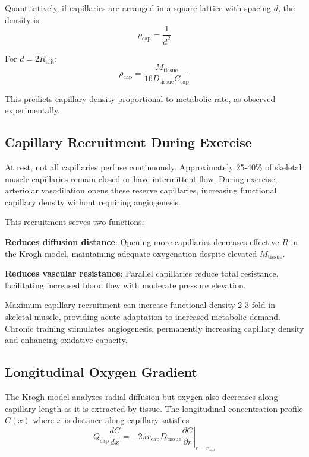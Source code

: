 Quantitatively, if capillaries are arranged in a square lattice with spacing $d$, the density is
\begin{equation}
\rho_{\mathrm{cap}} = \frac{1}{d^{2}}
\end{equation}

For $d = 2R_{\mathrm{crit}}$:
\begin{equation}
\rho_{\mathrm{cap}} = \frac{M_{\mathrm{tissue}}}{16D_{\mathrm{tissue}} C_{\mathrm{cap}}}
\end{equation}

This predicts capillary density proportional to metabolic rate, as observed experimentally.

\subsection{Capillary Recruitment During Exercise}

At rest, not all capillaries perfuse continuously. Approximately 25-40\% of skeletal muscle capillaries remain closed or have intermittent flow. During exercise, arteriolar vasodilation opens these reserve capillaries, increasing functional capillary density without requiring angiogenesis.

This recruitment serves two functions:

\textbf{Reduces diffusion distance}: Opening more capillaries decreases effective $R$ in the Krogh model, maintaining adequate oxygenation despite elevated $M_{\mathrm{tissue}}$.

\textbf{Reduces vascular resistance}: Parallel capillaries reduce total resistance, facilitating increased blood flow with moderate pressure elevation.

Maximum capillary recruitment can increase functional density 2-3 fold in skeletal muscle, providing acute adaptation to increased metabolic demand. Chronic training stimulates angiogenesis, permanently increasing capillary density and enhancing oxidative capacity.

\subsection{Longitudinal Oxygen Gradient}

The Krogh model analyzes radial diffusion but oxygen also decreases along capillary length as it is extracted by tissue. The longitudinal concentration profile $C(x)$ where $x$ is distance along capillary satisfies
\begin{equation}
Q_{\mathrm{cap}} \frac{dC}{dx} = -2\pi r_{\mathrm{cap}} D_{\mathrm{tissue}} \left.\frac{\partial C}{\partial r}\right|_{r=r_{\mathrm{cap}}}
\end{equation}

